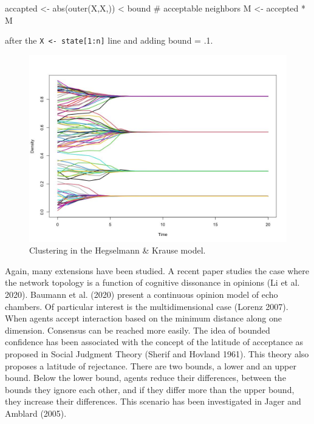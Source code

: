 \documentclass[
  letterpaper,
]{scrbook}
\newenvironment{Shaded}{\begin{snugshade}}{\end{snugshade}}
\newcommand{\CommentTok}[1]{\textcolor[rgb]{0.37,0.37,0.37}{#1}}
\newcommand{\FunctionTok}[1]{\textcolor[rgb]{0.28,0.35,0.67}{#1}}
\newcommand{\NormalTok}[1]{\textcolor[rgb]{0.00,0.23,0.31}{#1}}
\newcommand{\OtherTok}[1]{\textcolor[rgb]{0.00,0.23,0.31}{#1}}
\newcommand{\SpecialCharTok}[1]{\textcolor[rgb]{0.37,0.37,0.37}{#1}}
\newcommand{\StringTok}[1]{\textcolor[rgb]{0.13,0.47,0.30}{#1}}
\begin{document}
\begin{Shaded}
\begin{Highlighting}[]
\NormalTok{accapted }\OtherTok{\textless{}{-}} \FunctionTok{abs}\NormalTok{(}\FunctionTok{outer}\NormalTok{(X,X,}\StringTok{\textquotesingle{}{-}\textquotesingle{}}\NormalTok{)) }\SpecialCharTok{\textless{}}\NormalTok{ bound }\CommentTok{\# acceptable neighbors}
\NormalTok{M }\OtherTok{\textless{}{-}}\NormalTok{ accepted }\SpecialCharTok{*}\NormalTok{ M}
\end{Highlighting}
\end{Shaded}

after the \texttt{X\ \textless{}-\ state{[}1:n{]}} line and adding bound
= .1.

\begin{figure}

{\centering \includegraphics[width=4.47871in,height=\textheight]{media/ch7/image9.jpg}

}

\caption{\label{fig-ch7-img9-old-97}Clustering in the Hegselmann \&
Krause model.}

\end{figure}

Again, many extensions have been studied. A recent paper studies the
case where the network topology is a function of cognitive dissonance in
opinions (Li et al. 2020). Baumann et al. (2020) present a continuous
opinion model of echo chambers. Of particular interest is the
multidimensional case (Lorenz 2007). When agents accept interaction
based on the minimum distance along one dimension. Consensus can be
reached more easily. The idea of bounded confidence has been associated
with the concept of the latitude of acceptance as proposed in Social
Judgment Theory (Sherif and Hovland 1961). This theory also proposes a
latitude of rejectance. There are two bounds, a lower and an upper
bound. Below the lower bound, agents reduce their differences, between
the bounds they ignore each other, and if they differ more than the
upper bound, they increase their differences. This scenario has been
investigated in Jager and Amblard (2005).
\end{document}
